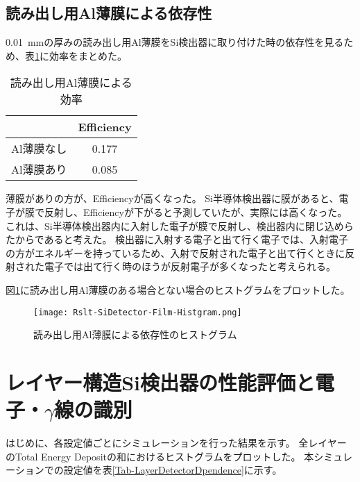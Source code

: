 \documentclass[a4paper,10pt]{jreport}
\begin{document}
\subsection{読み出し用Al薄膜による依存性}

\SI{0.01}{mm}の厚みの読み出し用Al薄膜をSi検出器に取り付けた時の依存性を見るため、表\ref{Tab-SiDetector-Film-Efficiency}に効率をまとめた。

\begin{table}[H] 
	\center
	\caption{読み出し用Al薄膜による効率} \label{Tab-SiDetector-Film-Efficiency}
	\begin{tabular}{cc}
		\hline
		 & Efficiency \\
		\hline
		Al薄膜なし & 0.177 \\
		Al薄膜あり & 0.085 \\
		\hline
	\end{tabular}
\end{table}

薄膜がありの方が、Efficiencyが高くなった。
Si半導体検出器に膜があると、電子が膜で反射し、Efficiencyが下がると予測していたが、実際には高くなった。
これは、Si半導体検出器内に入射した電子が膜で反射し、検出器内に閉じ込めらたからであると考えた。
検出器に入射する電子と出て行く電子では、入射電子の方がエネルギーを持っているため、入射で反射された電子と出て行くときに反射された電子では出て行く時のほうが反射電子が多くなったと考えられる。

図\ref{Rslt-SiDetector-Film-Histgram}に読み出し用Al薄膜のある場合とない場合のヒストグラムをプロットした。

\begin{figure}[H]
	\center
	\texttt{[image: Rslt-SiDetector-Film-Histgram.png]}
	\caption{読み出し用Al薄膜による依存性のヒストグラム} \label{Rslt-SiDetector-Film-Histgram}
\end{figure}



\section{レイヤー構造Si検出器の性能評価と電子・$\gamma$線の識別}

はじめに、各設定値ごとにシミュレーションを行った結果を示す。
全レイヤーのTotal Energy Depositの和におけるヒストグラムをプロットした。
本シミュレーションでの設定値を表\ref{Tab-LayerDetectorDpendence}に示す。
\end{document}
